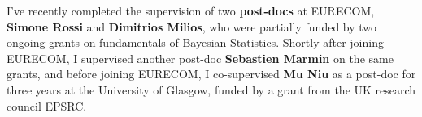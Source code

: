 \documentclass[oneside, a4paper, onecolumn, 10pt]{article}
\begin{document}
I've recently completed the supervision of two {\bf post-docs} at EURECOM, {\bf Simone Rossi} and {\bf Dimitrios Milios}, who were partially funded by two ongoing grants on fundamentals of Bayesian Statistics.
Shortly after joining EURECOM, I supervised another post-doc {\bf Sebastien Marmin} on the same grants, and before joining EURECOM, I co-supervised {\bf Mu Niu} as a post-doc for three years at the University of Glasgow, funded by a grant from the UK research council EPSRC. 
\end{document}
